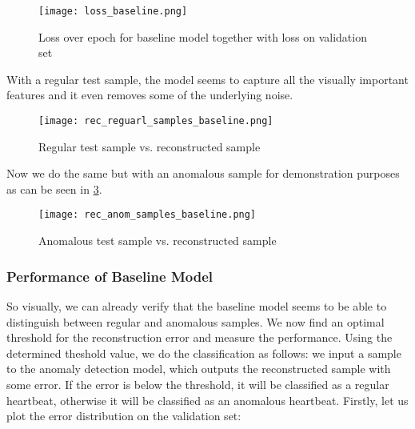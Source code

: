 \begin{figure}[h]
    \centering
    \texttt{[image: loss\_baseline.png]}
    \caption{Loss over epoch for baseline model together with loss on validation set}
    \label{fig:loss_baseline}
\end{figure}

With a regular test sample, the model seems to capture all the visually important features and it even removes some of the underlying noise.

\begin{figure}[H]
    \centering
    \texttt{[image: rec\_reguarl\_samples\_baseline.png]}
    \caption{Regular test sample vs. reconstructed sample}
    \label{fig:regog_vs_recon}
\end{figure}

Now we do the same but with an anomalous sample for demonstration purposes as can be seen in \cref{fig:anomog_vs_recon}.

\begin{figure}[h]
    \centering
    \texttt{[image: rec\_anom\_samples\_baseline.png]}
    \caption{Anomalous test sample vs. reconstructed sample}
    \label{fig:anomog_vs_recon}
\end{figure}

\subsubsection*{Performance of Baseline Model}
So visually, we can already verify that the baseline model seems to be able to distinguish between regular and anomalous samples. We now find an optimal threshold for the reconstruction error and measure the performance. Using the determined theshold value, we do the classification as follows: we input a sample to the anomaly detection model, which outputs the reconstructed sample with some error. If the error is below the threshold, it will be classified as a regular heartbeat, otherwise it will be classified as an anomalous heartbeat. Firstly, let us plot the error distribution on the validation set:

